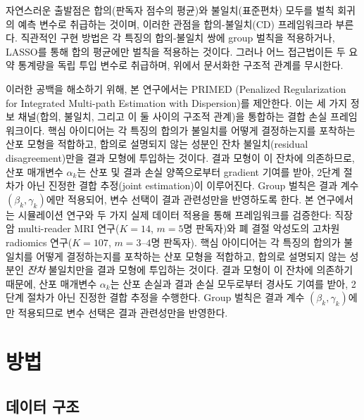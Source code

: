 \documentclass[a4paper,11pt]{article}
\begin{document}
자연스러운 출발점은 합의(판독자 점수의 평균)와 불일치(표준편차) 모두를 벌칙 회귀의 예측 변수로 취급하는 것이며, 이러한 관점을 합의-불일치(CD) 프레임워크라 부른다.
직관적인 구현 방법은 각 특징의 합의-불일치 쌍에 group 벌칙을 적용하거나, LASSO를 통해 합의 평균에만 벌칙을 적용하는 것이다.
그러나 어느 접근법이든 두 요약 통계량을 독립 투입 변수로 취급하며, 위에서 문서화한 구조적 관계를 무시한다.

이러한 공백을 해소하기 위해, 본 연구에서는 PRIMED (Penalized Regularization for Integrated Multi-path Estimation with Dispersion)를 제안한다. 이는 세 가지 정보 채널(합의, 불일치, 그리고 이 둘 사이의 구조적 관계)을 통합하는 결합 손실 프레임워크이다.
핵심 아이디어는 각 특징의 합의가 불일치를 어떻게 결정하는지를 포착하는 산포 모형을 적합하고, 합의로 설명되지 않는 성분인 잔차 불일치(residual disagreement)만을 결과 모형에 투입하는 것이다.
결과 모형이 이 잔차에 의존하므로, 산포 매개변수 $\alpha_k$는 산포 및 결과 손실 양쪽으로부터 gradient 기여를 받아, 2단계 절차가 아닌 진정한 결합 추정(joint estimation)이 이루어진다.
Group 벌칙은 결과 계수 $(\beta_k, \gamma_k)$에만 적용되어, 변수 선택이 결과 관련성만을 반영하도록 한다.
본 연구에서는 시뮬레이션 연구와 두 가지 실제 데이터 적용을 통해 프레임워크를 검증한다: 직장암 multi-reader MRI 연구($K = 14$, $m = 5$명 판독자)와 폐 결절 악성도의 고차원 radiomics 연구($K = 107$, $m = 3$--$4$명 판독자).
핵심 아이디어는 각 특징의 합의가 불일치를 어떻게 결정하는지를 포착하는 산포 모형을 적합하고, 합의로 설명되지 않는 성분인 \emph{잔차} 불일치만을 결과 모형에 투입하는 것이다.
결과 모형이 이 잔차에 의존하기 때문에, 산포 매개변수 $\alpha_k$는 산포 손실과 결과 손실 모두로부터 경사도 기여를 받아, 2단계 절차가 아닌 진정한 결합 추정을 수행한다.
Group 벌칙은 결과 계수 $(\beta_k, \gamma_k)$에만 적용되므로 변수 선택은 결과 관련성만을 반영한다.

\section{방법}\label{sec:methods}

\subsection{데이터 구조}\label{sec:data}
\end{document}
